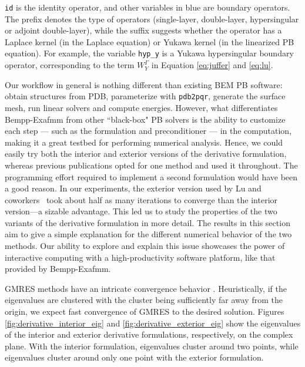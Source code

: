 \noindent
\texttt{id} is the identity operator, and other variables in blue are boundary operators.
The prefix denotes the type of operators (single-layer, double-layer, hypersingular or adjoint double-layer), while the suffix suggests whether the operator has a Laplace kernel (in the Laplace equation) or Yukawa kernel (in the linearized PB equation).
For example, the variable \texttt{hyp\_y} is a Yukawa hypersingular boundary operator, corresponding to the term $W_{Y}^{\Gamma}$ in Equation \ref{eq:juffer} and \ref{eq:lu}.

Our workflow in general is nothing different than existing BEM PB software: obtain structures from PDB, parameterize with \texttt{pdb2pqr}, generate the surface mesh, run linear solvers and compute energies.
However, what differentiates Bempp-Exafmm from other ``black-box" PB solvers is the ability to customize each step --- such as the formulation and preconditioner --- in the computation, making it a great testbed for performing numerical analysis.
Hence, we could easily try both the interior and exterior versions of the derivative formulation, whereas previous publications opted for one method and used it throughout.
The programming effort required to implement a second formulation would have been a good reason.
In our experiments, the exterior version used by Lu and coworkers~\cite{LuETal2006,LuETal2009,ZhangETal2019} took about half as many iterations to converge than the interior version---a sizable advantage.
This led us to study the properties of the two variants of the derivative formulation in more detail.
The results in this section aim to give a simple explanation for the different numerical behavior of the two methods.
Our ability to explore and explain this issue showcases the power of interactive computing with a high-productivity software platform, like that provided by Bempp-Exafmm.

GMRES methods have an intricate convergence behavior \cite{mark1999a}.
Heuristically, if the eigenvalues are clustered with the cluster being sufficiently far away from the origin, we expect fast convergence of GMRES to the desired solution.
Figures \ref{fig:derivative_interior_eig} and \ref{fig:derivative_exterior_eig} show the eigenvalues of the interior and exterior derivative formulations, respectively, on the complex plane.
With the interior formulation, eigenvalues cluster around two points, while eigenvalues cluster around only one point with the exterior formulation.

